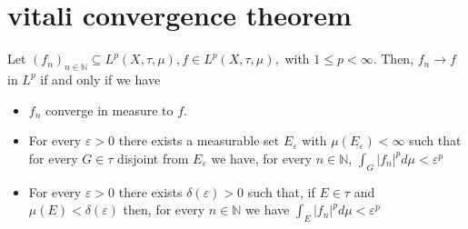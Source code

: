 \section{vitali convergence theorem}

\begin{theorem}
Let $\left(f_{n}\right)_{n \in \mathbb{N}} \subseteq L^{p}(X, \tau, \mu), f \in L^{p}(X, \tau, \mu),$ with $1 \leq p<\infty .$ Then, $f_{n} \rightarrow f$ in $L^{p}$ if and only if we have
\begin{itemize}
	\item $f_{n}$ converge in measure to $f$.
	\item For every $\varepsilon>0$ there exists a measurable set $E_{\varepsilon}$ with $\mu\left(E_{\varepsilon}\right)<\infty$ such that for every $G \in \tau$ disjoint from $E_{\varepsilon}$ we have, for every $n \in \mathbb{N}$, $\int_{G}\left|f_{n}\right|^{p} d \mu<\varepsilon^{p}$
	\item  For every $\varepsilon>0$ there exists $\delta(\varepsilon)>0$ such that, if $E \in \tau$ and $\mu(E)<\delta(\varepsilon)$ then, for every $n \in \mathbb{N}$ we have $\int_{E}\left|f_{n}\right|^{p} d \mu<\varepsilon^{p}$	
\end{itemize}
\end{theorem}

